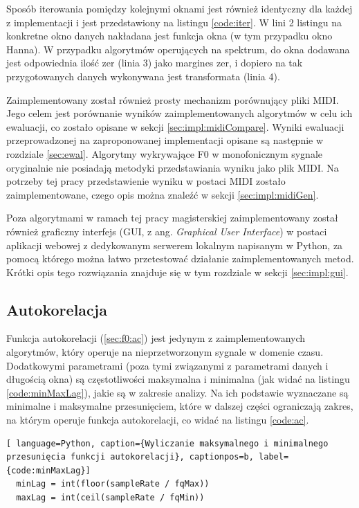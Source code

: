 \documentclass[12pt,a4paper,twoside]{mwart}
\begin{document}
Sposób iterowania pomiędzy kolejnymi oknami jest również identyczny dla każdej z implementacji i jest przedstawiony na listingu \ref{code:iter}. W lini 2 listingu na konkretne okno danych nakładana jest funkcja okna (w tym przypadku okno Hanna). W przypadku algorytmów operujących na spektrum, do okna dodawana jest odpowiednia ilość zer (linia 3) jako margines zer, i dopiero na tak przygotowanych danych wykonywana jest transformata (linia 4).

Zaimplementowany został również prosty mechanizm porównujący pliki MIDI. Jego celem jest porównanie wyników zaimplementowanych algorytmów w celu ich ewaluacji, co zostało opisane w sekcji \ref{sec:impl:midiCompare}. Wyniki ewaluacji przeprowadzonej na zaproponowanej implementacji opisane są następnie w rozdziale \ref{sec:ewal}. Algorytmy wykrywające F0 w monofonicznym sygnale oryginalnie nie posiadają metodyki przedstawiania wyniku jako plik MIDI. Na potrzeby tej pracy przedstawienie wyniku w postaci MIDI zostało zaimplementowane, czego opis można znaleźć w sekcji \ref{sec:impl:midiGen}.

Poza algorytmami w ramach tej pracy magisterskiej zaimplementowany został również graficzny interfejs (GUI, z ang. \textit{Graphical User Interface}) w postaci aplikacji webowej z dedykowanym serwerem lokalnym napisanym w Python, za pomocą którego można łatwo przetestować działanie zaimplementowanych metod. Krótki opis tego rozwiązania znajduje się w tym rozdziale w sekcji \ref{sec:impl:gui}.

\subsection{Autokorelacja}\label{sec:impl:alg:ac}
Funkcja autokorelacji (\ref{sec:f0:ac}) jest jedynym z zaimplementowanych algorytmów, który operuje na nieprzetworzonym sygnale w domenie czasu. Dodatkowymi parametrami (poza tymi związanymi z parametrami danych i długością okna) są częstotliwości maksymalna i minimalna (jak widać na listingu \ref{code:minMaxLag}), jakie są w zakresie analizy. Na ich podstawie wyznaczane są minimalne i maksymalne przesunięciem, które w dalszej części ograniczają zakres, na którym operuje funkcja autokorelacji, co widać na listingu \ref{code:ac}.
\begin{lstlisting}[ language=Python, caption={Wyliczanie maksymalnego i minimalnego przesunięcia funkcji autokorelacji}, captionpos=b, label={code:minMaxLag}]
  minLag = int(floor(sampleRate / fqMax))
  maxLag = int(ceil(sampleRate / fqMin))
\end{lstlisting}
\end{document}
